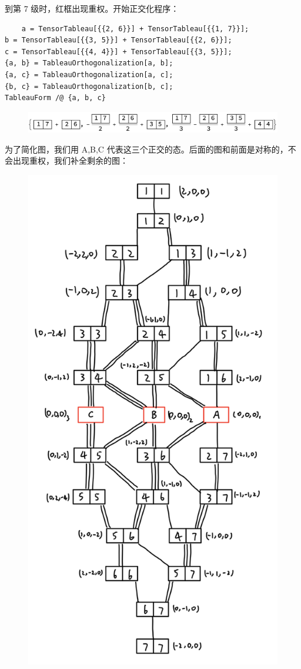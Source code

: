 \documentclass[UTF8]{ctexart}
\begin{document}
\noindent 到第 7 级时，红框出现重权。开始正交化程序：

\begin{verbatim}
	a = TensorTableau[{{2, 6}}] + TensorTableau[{{1, 7}}];
b = TensorTableau[{{3, 5}}] + TensorTableau[{{2, 6}}];
c = TensorTableau[{{4, 4}}] + TensorTableau[{{3, 5}}];
{a, b} = TableauOrthogonalization[a, b];
{a, c} = TableauOrthogonalization[a, c];
{b, c} = TableauOrthogonalization[b, c];
TableauForm /@ {a, b, c}
\end{verbatim}

\begin{figure}[H]
\begin{centering}
\includegraphics[width=0.95\linewidth]{include/O14}
\par\end{centering}
\end{figure}

\noindent 为了简化图，我们用 A,B,C 代表这三个正交的态。后面的图和前面是对称的，不会出现重权，我们补全剩余的图：

\begin{figure}[H]
\begin{centering}
\includegraphics[width=0.5\linewidth]{include/T7}
\par\end{centering}
\end{figure}
\end{document}
